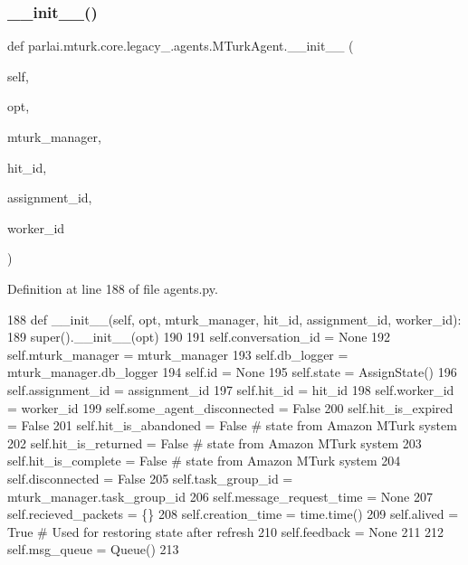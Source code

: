 \subsubsection{\texorpdfstring{\+\_\+\+\_\+init\+\_\+\+\_\+()}{\_\_init\_\_()}}
{\footnotesize\ttfamily def parlai.\+mturk.\+core.\+legacy\+\_.\+agents.\+M\+Turk\+Agent.\+\_\+\+\_\+init\+\_\+\+\_\+ (\begin{DoxyParamCaption}\item[{}]{self,  }\item[{}]{opt,  }\item[{}]{mturk\+\_\+manager,  }\item[{}]{hit\+\_\+id,  }\item[{}]{assignment\+\_\+id,  }\item[{}]{worker\+\_\+id }\end{DoxyParamCaption})}



Definition at line 188 of file agents.\+py.


\begin{DoxyCode}
188     \textcolor{keyword}{def }\_\_init\_\_(self, opt, mturk\_manager, hit\_id, assignment\_id, worker\_id):
189         super().\_\_init\_\_(opt)
190 
191         self.conversation\_id = \textcolor{keywordtype}{None}
192         self.mturk\_manager = mturk\_manager
193         self.db\_logger = mturk\_manager.db\_logger
194         self.id = \textcolor{keywordtype}{None}
195         self.state = AssignState()
196         self.assignment\_id = assignment\_id
197         self.hit\_id = hit\_id
198         self.worker\_id = worker\_id
199         self.some\_agent\_disconnected = \textcolor{keyword}{False}
200         self.hit\_is\_expired = \textcolor{keyword}{False}
201         self.hit\_is\_abandoned = \textcolor{keyword}{False}  \textcolor{comment}{# state from Amazon MTurk system}
202         self.hit\_is\_returned = \textcolor{keyword}{False}  \textcolor{comment}{# state from Amazon MTurk system}
203         self.hit\_is\_complete = \textcolor{keyword}{False}  \textcolor{comment}{# state from Amazon MTurk system}
204         self.disconnected = \textcolor{keyword}{False}
205         self.task\_group\_id = mturk\_manager.task\_group\_id
206         self.message\_request\_time = \textcolor{keywordtype}{None}
207         self.recieved\_packets = \{\}
208         self.creation\_time = time.time()
209         self.alived = \textcolor{keyword}{True}  \textcolor{comment}{# Used for restoring state after refresh}
210         self.feedback = \textcolor{keywordtype}{None}
211 
212         self.msg\_queue = Queue()
213 
\end{DoxyCode}


